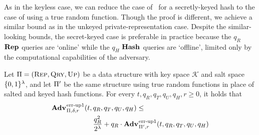 
%
As in the keyless case, we can reduce the case of \erreps\ for a secretly-keyed
hash to the case of  using a true random function. Though the proof is
different, we achieve a similar bound as in the unkeyed private-representation
case. Despite the similar-looking bounds, the secret-keyed case is preferable in
practice because the $q_R$ $\textup{\textbf{Rep}}\hspace{0.5pt}$ queries are `online' while the $q_H$ $\textup{\textbf{Hash}}\hspace{0.5pt}$
queries are `offline', limited only by the computational capabilities of the
adversary.
%

\begin{lemma}\label{lemma:keytorand}
  Let $\mathrm{\Pi} = (\textnormal{\textsc{Rep}}, \textnormal{\textsc{Qry}}, \textnormal{\textsc{Up}})$ be a data structure with key space
  $\mathcal{K}$ and salt space $\{0,1\}^\lambda$, and let $\mathrm{\Pi}'$ be the same
  structure using true random functions in place of salted and keyed hash
  functions. For every $t, q_R, q_T, q_U, q_H, r \geq 0$, it holds that
  \begin{equation*}
    \begin{aligned}
      \Adv{\errep1}_{\struct,\delta,r}(t,\,&q_R, q_T, q_U, q_H) \leq \\
        &\frac{q_R^2}{2^\lambda} + q_R \cdot \Adv{\errep1}_{\struct',r}(t, q_R, q_T, q_U, q_H)
     \end{aligned}
  \end{equation*}
\end{lemma}

